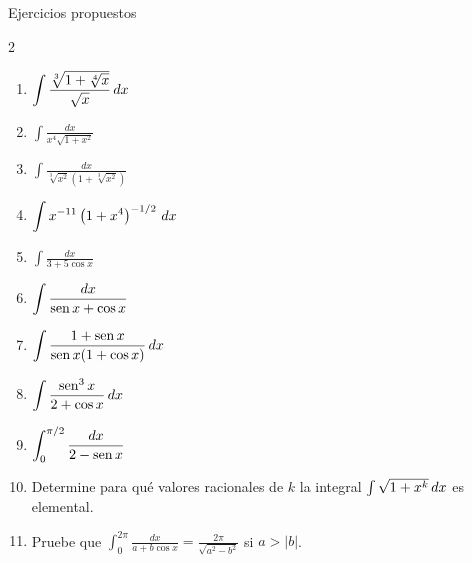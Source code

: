 \documentclass[10pt,aspectratio=169]{beamer}
\begin{document}
\begin{frame}{Ejercicios propuestos}
  \small
  \begin{ejercicio}
    \begin{multicols}{2}
    \begin{enumerate}
      \item $\displaystyle\int\frac{\sqrt[3]{1+\sqrt[4]x}}{\sqrt x}\,dx$
      \item $\displaystyle\int\frac{dx}{x^4\sqrt{1+x^2}}$
      \item $\displaystyle\int\frac{dx}{\sqrt[3]{x^2}\left(1+\sqrt[3]{x^2}\right)}$
      \item $\displaystyle\int x^{-11}\left(1+x^4\right)^{-1/2}\,dx$
      \item $\displaystyle\int\frac{dx}{3+5\cos x}$
      \item $\displaystyle\int\frac{dx}{\operatorname{sen} x+\cos x}$
      \item $\displaystyle\int\frac{1+\operatorname{sen} x}{\operatorname{sen} x(1+\cos x)}\,dx$
      \item $\displaystyle\int\frac{\operatorname{sen}^3x}{2+\cos x}\,dx$
      \item $\displaystyle\int_0^{\pi/2}\frac{dx}{2-\operatorname{sen} x}$
    \end{enumerate}
    \end{multicols}
  \end{ejercicio}
    \begin{enumerate}
      \setcounter{enumi}{9}
      \item Determine para qué valores racionales de $k$ la integral $\int\sqrt{1+x^k}\,dx$ es elemental.
      \item Pruebe que $\displaystyle\int_0^{2\pi}\frac{dx}{a+b\cos x}=\frac{2\pi}{\sqrt{a^2-b^2}}$ si $a>|b|$.
    \end{enumerate}

\end{frame}
\end{document}
